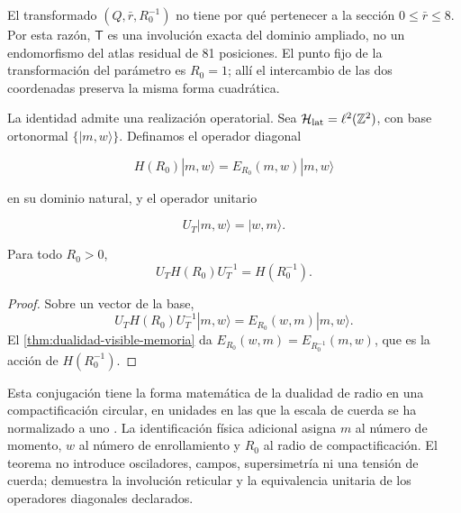El transformado \((Q,\bar r,R_0^{-1})\) no tiene por qué pertenecer a la
sección \(0\leq\bar r\leq8\). Por esta razón, \(\mathsf T\) es una
involución exacta del dominio ampliado, no un endomorfismo del atlas residual
de 81 posiciones. El punto fijo de la transformación del parámetro es
\(R_0=1\); allí el intercambio de las dos coordenadas preserva la misma forma
cuadrática.

La identidad admite una realización operatorial. Sea
\(\mathcal H_{\rm lat}=\ell^2(\mathbb Z^2)\), con base ortonormal
\(\{|m,w\rangle\}\). Definamos el operador diagonal

\[
H(R_0)|m,w\rangle=E_{R_0}(m,w)|m,w\rangle
\]

en su dominio natural, y el operador unitario

\[
U_T|m,w\rangle=|w,m\rangle.
\]

\begin{corollary}
\label{cor:dualidad-unitaria}
Para todo \(R_0>0\),
\[
U_TH(R_0)U_T^{-1}=H(R_0^{-1}).
\]
\end{corollary}

\begin{proof}
Sobre un vector de la base,
\[
U_TH(R_0)U_T^{-1}|m,w\rangle
=E_{R_0}(w,m)|m,w\rangle.
\]
El \cref{thm:dualidad-visible-memoria} da
\(E_{R_0}(w,m)=E_{R_0^{-1}}(m,w)\), que es la acción de
\(H(R_0^{-1})\).
\end{proof}

Esta conjugación tiene la forma matemática de la dualidad de radio en una
compactificación circular, en unidades en las que la escala de cuerda se ha
normalizado a uno \cite{Giveon1994}. La identificación física adicional
asigna \(m\) al número de momento, \(w\) al número de enrollamiento y \(R_0\)
al radio de compactificación. El teorema no introduce osciladores, campos,
supersimetría ni una tensión de cuerda; demuestra la involución reticular y la
equivalencia unitaria de los operadores diagonales declarados.
